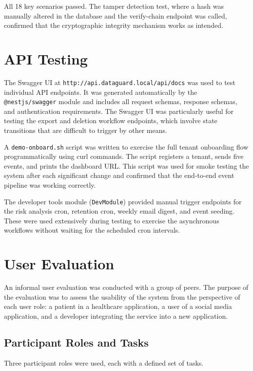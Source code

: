 \documentclass[a4paper,12pt,onecolumn]{report}
\begin{document}
All 18 key scenarios passed.
The tamper detection test, where a hash was manually altered in the database and the verify-chain endpoint was called, confirmed that the cryptographic integrity mechanism works as intended.

\section{API Testing}

The Swagger UI at \texttt{http://api.dataguard.local/api/docs} was used to test individual API endpoints.
It was generated automatically by the \texttt{@nestjs/swagger} module and includes all request schemas, response schemas, and authentication requirements.
The Swagger UI was particularly useful for testing the export and deletion workflow endpoints, which involve state transitions that are difficult to trigger by other means.

A \texttt{demo-onboard.sh} script was written to exercise the full tenant onboarding flow programmatically using curl commands.
The script registers a tenant, sends five events, and prints the dashboard URL.
This script was used for smoke testing the system after each significant change and confirmed that the end-to-end event pipeline was working correctly.

The developer tools module (\texttt{DevModule}) provided manual trigger endpoints for the risk analysis cron, retention cron, weekly email digest, and event seeding.
These were used extensively during testing to exercise the asynchronous workflows without waiting for the scheduled cron intervals.

\section{User Evaluation}

An informal user evaluation was conducted with a group of peers.
The purpose of the evaluation was to assess the usability of the system from the perspective of each user role: a patient in a healthcare application, a user of a social media application, and a developer integrating the service into a new application.

\subsection{Participant Roles and Tasks}

Three participant roles were used, each with a defined set of tasks.
\end{document}
